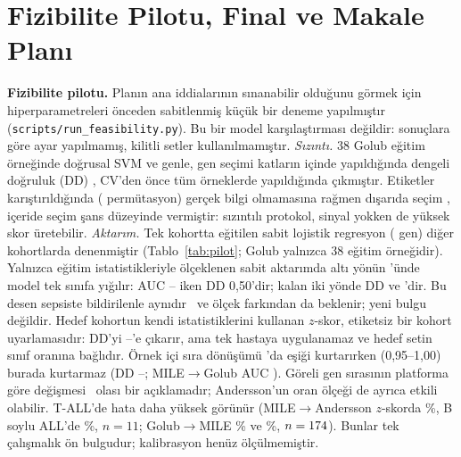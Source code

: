 \documentclass[conference]{IEEEtran}
\newcommand{\tabref}[1]{Tablo~\ref{#1}}
\begin{document}
\section{Fizibilite Pilotu, Final ve Makale Planı}\label{sec:plan}
\textbf{Fizibilite pilotu.} Planın ana iddialarının sınanabilir olduğunu görmek için hiperparametreleri
önceden sabitlenmiş küçük bir deneme yapılmıştır (\texttt{scripts/run\_feasibility.py}). Bu bir model
karşılaştırması değildir: sonuçlara göre ayar yapılmamış, kilitli setler kullanılmamıştır.
\emph{Sızıntı.} 38 Golub eğitim örneğinde doğrusal SVM ve \PilotK{} genle, gen seçimi katların içinde
yapıldığında dengeli doğruluk (DD) \PilotInReal, CV'den önce tüm örneklerde yapıldığında
\PilotOutReal{} çıkmıştır. Etiketler karıştırıldığında (\PilotNPerm{} permütasyon) gerçek bilgi
olmamasına rağmen dışarıda seçim \PilotOutPerm{}, içeride seçim şans düzeyinde \PilotInPerm{}
vermiştir: sızıntılı protokol, sinyal yokken de yüksek skor üretebilir.
\emph{Aktarım.} Tek kohortta eğitilen sabit lojistik regresyon (\PilotKT{} gen) diğer kohortlarda
denenmiştir (\tabref{tab:pilot}; Golub yalnızca 38 eğitim örneğidir). Yalnızca eğitim istatistikleriyle
ölçeklenen sabit aktarımda altı yönün \PilotRawSingle'ünde model tek sınıfa yığılır: AUC
\PilotRawAucMin--\PilotRawAucMax{} iken DD 0,50'dir; kalan iki yönde DD \PilotRawOtherMin{} ve
\PilotRawOtherMax'dir. Bu desen sepsiste bildirilenle aynıdır~\cite{zheng2026} ve ölçek farkından da
beklenir; yeni bulgu değildir. Hedef kohortun kendi istatistiklerini kullanan $z$-skor, etiketsiz bir
kohort uyarlamasıdır: DD'yi \PilotBaMin--\PilotBaMax'e çıkarır, ama tek hastaya uygulanamaz ve hedef
setin sınıf oranına bağlıdır. Örnek içi sıra dönüşümü \cite{zheng2026}'da eşiği kurtarırken (0,95--1,00)
burada kurtarmaz (DD \PilotRankMin--\PilotRankMax; MILE$\to$Golub AUC \PilotRankAucMG). Göreli gen
sırasının platforma göre değişmesi~\cite{lee2025} olası bir açıklamadır; Andersson'un oran ölçeği de
ayrıca etkili olabilir. T-ALL'de hata daha yüksek görünür (MILE$\to$Andersson $z$-skorda \%\PilotTallMA,
B soylu ALL'de \%\PilotBallMA, $n=11$; Golub$\to$MILE \%\PilotTallGM{} ve \%\PilotBallGM,
$n=174$). Bunlar tek çalışmalık ön bulgudur; kalibrasyon henüz ölçülmemiştir.

\begin{table}[!t]
\caption{Aktarım pilotu. Ham: yalnızca eğitim istatistikleri; $z$: hedef kohort istatistikleri; sıra: örnek içi. DD: dengeli doğruluk. Sabit model, ayar yok.}
\label{tab:pilot}
\centering\scriptsize\setlength{\tabcolsep}{4pt}

\end{table}
\end{document}
